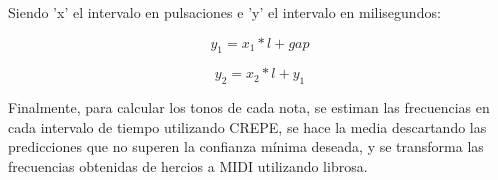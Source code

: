 Siendo 'x' el intervalo en pulsaciones e 'y' el intervalo en milisegundos:

\begin{displaymath}
	y_1 =  x_1 * l + gap
\end{displaymath}

\begin{displaymath}
	y_2 = x_2 * l + y_1
\end{displaymath}

Finalmente, para calcular los tonos de cada nota, se estiman las frecuencias en cada intervalo de tiempo utilizando CREPE, se hace la media descartando las predicciones que no superen la confianza mínima deseada, y se transforma las frecuencias obtenidas de hercios a MIDI utilizando librosa.
